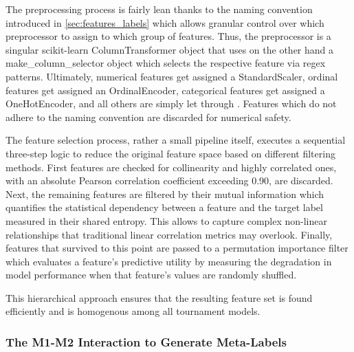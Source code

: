 \documentclass[12pt, a4paper]{article}
\begin{document}
\medskip

The preprocessing process is fairly lean thanks to the naming convention introduced in \ref{sec:features_labels} which allows granular control over which preprocessor to assign to which group 
of features. Thus, the preprocessor is a singular scikit-learn ColumnTransformer object that uses on the other hand a make\_column\_selector object which selects the respective feature via 
regex patterns. Ultimately, numerical features get assigned a StandardScaler, ordinal features get assigned an OrdinalEncoder, categorical features get assigned a OneHotEncoder, and all others 
are simply let through \parencite{scikit-learn}. Features which do not adhere to the naming convention are discarded for numerical safety.

\medskip

The feature selection process, rather a small pipeline itself, executes a sequential three-step logic to reduce the original feature space based on different filtering methods.
First features are checked for collinearity and highly correlated ones, with an absolute Pearson correlation coefficient exceeding 0.90, are discarded. Next, the remaining features are filtered 
by their mutual information which quantifies the statistical dependency between a feature and the target label measured in their shared entropy. This allows to capture complex non-linear 
relationships that traditional linear correlation metrics may overlook. Finally, features that survived to this point are passed to a permutation importance filter which 
evaluates a feature's predictive utility by measuring the degradation in model performance when that feature's values are randomly shuffled.

\medskip

This hierarchical approach ensures that the resulting feature set is found efficiently and is homogenous among all tournament models.


\subsubsection{The M1-M2 Interaction to Generate Meta-Labels}\label{sec:meta_label_accumulation}
\end{document}

